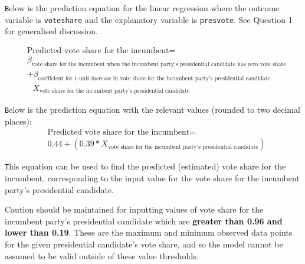 \documentclass[12pt,letterpaper]{article}
\begin{document}
\begin{enumerate}
			\texttt Below is the prediction equation for the linear regression where the outcome variable is \texttt{voteshare} and the explanatory variable is \texttt{presvote}. See Question 1 for generalised discussion.
			
			\begin{align*}
				&\text{Predicted vote share for the incumbent} = \\ &\beta_\text{vote share for the incumbent when the 	incumbent party's presidential candidate has zero vote share} \\ & + \beta_\text{coefficient for 1-unit increase in vote share for the incumbent party's presidential candidate} \\ & \text{\ \ \ }X_\text{vote share for the incumbent party's presidential candidate}
			\end{align*}
			
			\texttt Below is the prediction equation with the relevant values (rounded to two decimal places):
			\begin{align*}
				&\text{Predicted vote share for the incumbent} = \\ & 0.44 + (0.39 * X_\text{vote share for the incumbent party's presidential candidate})
			\end{align*}
			
			\texttt This equation can be used to find the predicted (estimated) vote share for the incumbent, corresponding to the input value for the vote share for the incumbent party's presidential candidate.
			
			Caution should be maintained for inputting values of vote share for the incumbent party's presidential candidate which are \textbf{greater than 0.96 and lower than 0.19}. These are the maximum and minimum observed data points for the given presidential candidate's vote share, and so the model cannot be assumed to be valid outside of these value thresholds.
			
				
				
	\end{enumerate}
	

\newpage	
\end{document}
